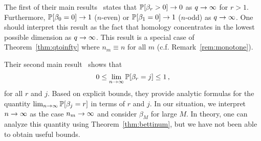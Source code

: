 The first of their
main results~\cite[Thm 2.1]{ginzburg2017random} states that
$\mathbb{P}[\beta_r > 0] \rightarrow 0$ as $q \rightarrow \infty$ for $r>1$. Furthermore,
$\mathbb{P}[\beta_0 = 0] \rightarrow 1$ ($n$-even) or $\mathbb{P}[\beta_1 = 0] \rightarrow 1$ ($n$-odd)
as $q \rightarrow \infty$. One should interpret this result as the fact that
homology concentrates in the lowest possible dimension as $q \rightarrow \infty$.
This result is a special case of Theorem~\ref{thm:qtoinfty} 
where $n_m \equiv n$ for all $m$ (c.f. Remark~\ref{rem:monotone}).

Their second main result~\cite[Thm 2.2]{ginzburg2017random} shows that
\[
  0 \leq \lim_{n \rightarrow \infty} \mathbb{P}[\beta_r = j] \leq 1 \, ,
\]
for all $r$ and $j$. Based on explicit bounds, they provide analytic
formulas for the quantity $\lim_{n\rightarrow \infty}\mathbb{P}[\beta_j=r]$ in terms
of $r$ and $j$. In our situation, we interpret $n \rightarrow \infty$ as the case
$n_m \rightarrow \infty$ and consider $\beta_M$ for large $M$. In theory,
one can analyze this quantity using Theorem~\ref{thm:bettinum},
but we have not been able to obtain useful bounds.

